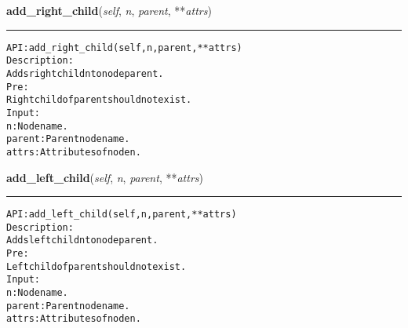     \label{coinor:gimpy:tree:BinaryTree:add_right_child}

    \vspace{0.5ex}

\hspace{.8\funcindent}\begin{boxedminipage}{\funcwidth}

    \raggedright \textbf{add\_right\_child}(\textit{self}, \textit{n}, \textit{parent}, **\textit{attrs})

    \vspace{-1.5ex}

    \rule{\textwidth}{0.5\fboxrule}
\setlength{\parskip}{2ex}
\begin{alltt}

API: add\_right\_child(self, n, parent, **attrs)
Description:
    Adds right child n to node parent.
Pre:
    Right child of parent should not exist.
Input:
    n: Node name.
    parent: Parent node name.
    attrs: Attributes of node n.
\end{alltt}

\setlength{\parskip}{1ex}
    \end{boxedminipage}

    \label{coinor:gimpy:tree:BinaryTree:add_left_child}

    \vspace{0.5ex}

\hspace{.8\funcindent}\begin{boxedminipage}{\funcwidth}

    \raggedright \textbf{add\_left\_child}(\textit{self}, \textit{n}, \textit{parent}, **\textit{attrs})

    \vspace{-1.5ex}

    \rule{\textwidth}{0.5\fboxrule}
\setlength{\parskip}{2ex}
\begin{alltt}

API: add\_left\_child(self, n, parent, **attrs)
Description:
    Adds left child n to node parent.
Pre:
    Left child of parent should not exist.
Input:
    n: Node name.
    parent: Parent node name.
    attrs: Attributes of node n.
\end{alltt}

\setlength{\parskip}{1ex}
    \end{boxedminipage}


